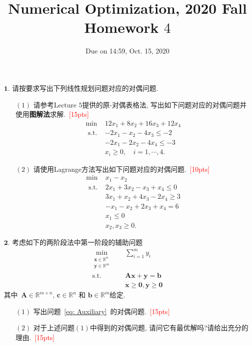 \documentclass[10pt]{article}
\begin{document}
	
\title{	Numerical Optimization, 2020 Fall\\Homework $4$}
\date{Due on 14:59, Oct. 15, 2020\\}
\maketitle


$\bm{1}.$ 请按要求写出下列线性规划问题对应的对偶问题.
\begin{itemize}
	\item[$(1)$] 请参考Lecture $5$提供的原-对偶表格法, 写出如下问题对应的对偶问题并使用\textbf{图解法}求解.~\textcolor{red}{[15pts]}
	\begin{equation}
		\begin{array}{ll}
			\min & 12 x_{1}+8 x_{2}+16 x_{3}+12 x_{4} \\
			\text { s.t. } & -2 x_{1}-x_{2}-4 x_{3} \leq -2 \\
			& -2 x_{1}-2 x_{2}-4 x_{4} \leq -3 \\
			& x_{i} \geq 0, \quad i=1, \cdots, 4.
		\end{array}
	\end{equation}

	\item[$(2)$] 请使用Lagrange方法写出如下问题对应的对偶问题.~\textcolor{red}{[10pts]}
	\begin{equation}
		\begin{array}{ll}
			\min & x_{1} - x_{2} \\
			\text { s.t. } & 2 x_{1} + 3 x_{2} - x_{3} + x_{4} \leq 0 \\
			& 3 x_{1} + x_{2}  + 4 x_{3} - 2 x_{4} \geq 3 \\
			& -x_{1} - x_{2} + 2 x_{3} + x_{4} = 6\\
			& x_1 \leq 0\\
			& x_{2}, x_{3} \geq 0.
		\end{array}
	\end{equation}
\end{itemize}

$\bm{2}.$ 考虑如下的两阶段法中第一阶段的辅助问题
\begin{equation}\label{eq: Auxiliary}
	\begin{aligned}
		\min_{\substack{\bm{x}\in \mathbb{R}^{n}\\\bm{y}\in\mathbb{R}^{m}}}~\quad&\sum_{i=1}^{m}y_i\\
		\textrm{s.t.}~\quad&\bm{A}\bm{x} + \bm{y}= \bm{b}\\
		&\bm{x}\geq \bm{0}, \bm{y} \geq \bm{0}
	\end{aligned}
\end{equation}
其中~$\bm{A}\in\mathbb{R}^{m\times n}$, $\bm{c}\in\mathbb{R}^{n}$ 和 $\bm{b}\in\mathbb{R}^{m}$给定.
\begin{itemize}
	\item[$(1)$] 写出问题~\eqref{eq: Auxiliary}~的对偶问题.~\textcolor{red}{[15pts]}
	
	\item[$(2)$] 对于上述问题$(1)$中得到的对偶问题, 请问它有最优解吗?请给出充分的理由.~\textcolor{red}{[15pts]}
\end{itemize}
\end{document}
